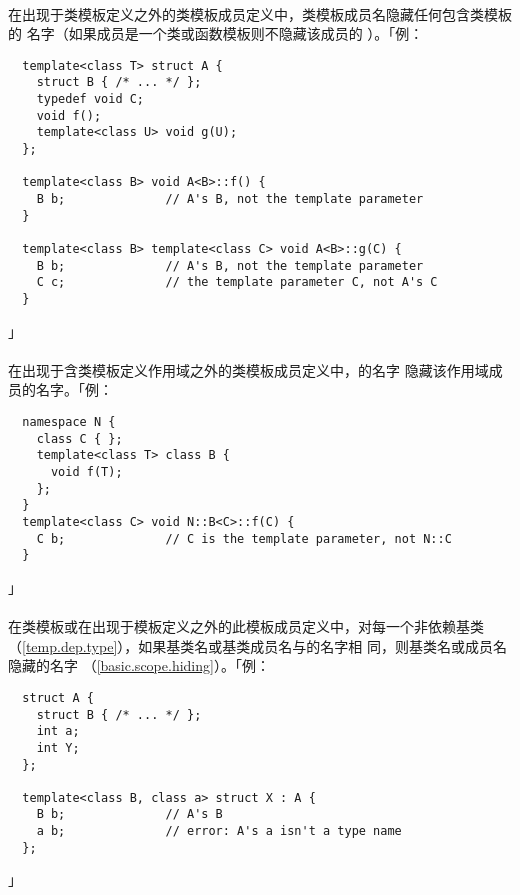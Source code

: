\paragraph{}
在出现于类模板定义之外的类模板成员定义中，类模板成员名隐藏任何包含类模板的
名字（如果成员是一个类或函数模板则不隐藏该成员的
）。「例：
\begin{lstlisting}
  template<class T> struct A {
    struct B { /* ... */ };
    typedef void C;
    void f();
    template<class U> void g(U);
  };

  template<class B> void A<B>::f() {
    B b;              // A's B, not the template parameter
  }

  template<class B> template<class C> void A<B>::g(C) {
    B b;              // A's B, not the template parameter
    C c;              // the template parameter C, not A's C
  }
\end{lstlisting}」

\paragraph{}
在出现于含类模板定义作用域之外的类模板成员定义中，的名字
隐藏该作用域成员的名字。「例：
\begin{lstlisting}
  namespace N {
    class C { };
    template<class T> class B {
      void f(T);
    };
  }
  template<class C> void N::B<C>::f(C) {
    C b;              // C is the template parameter, not N::C
  }
\end{lstlisting}」

\paragraph{}
在类模板或在出现于模板定义之外的此模板成员定义中，对每一个非依赖基类
（\ref{temp.dep.type}），如果基类名或基类成员名与的名字相
同，则基类名或成员名隐藏的名字
（\ref{basic.scope.hiding}）。「例：
\begin{lstlisting}
  struct A {
    struct B { /* ... */ };
    int a;
    int Y;
  };

  template<class B, class a> struct X : A {
    B b;              // A's B
    a b;              // error: A's a isn't a type name
  };
\end{lstlisting}」

